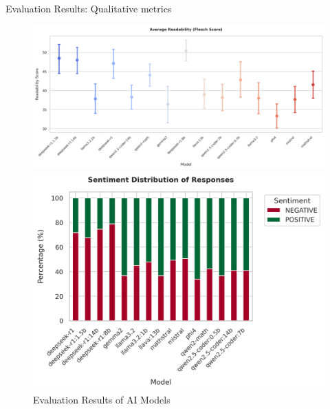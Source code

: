 \documentclass{beamer}
\begin{document}
\begin{frame}{Evaluation Results: Qualitative metrics}
\begin{figure}
    \begin{minipage}{0.45\textwidth}
      \centering
      \includegraphics[width=\textwidth]{readability.png}
    \end{minipage}
    \hfill
    \begin{minipage}{0.45\textwidth}
      \centering
      \includegraphics[width=\textwidth]{sentiment.png}
    \end{minipage}
    
    \caption{Evaluation Results of AI Models}
    \label{fig:evaluation-results}
  \end{figure}
\end{frame}
\end{document}
